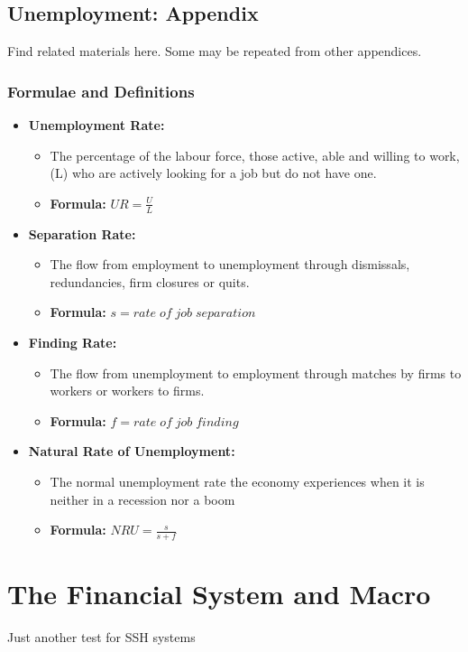 \documentclass[12pt, letterpaper]{article}
\begin{document}
\subsection{Unemployment: Appendix}
Find related materials here. Some may be repeated from other appendices.
\subsubsection{Formulae and Definitions}
\begin{itemize}
	\item \textbf{Unemployment Rate:}
		\begin{itemize}
			\item The percentage of the labour force, those active, able and willing to work, (L) who are actively looking for a job but do not have one.
			\item \textbf{Formula:} $UR = \frac{U}{L}$
		\end{itemize}
	\item	\textbf{Separation Rate:}
		\begin{itemize}
			\item The flow from employment to unemployment through dismissals, redundancies, firm closures or quits.
			\item \textbf{Formula:} $s = rate\;of\;job\;separation$
		\end{itemize}
	\item	\textbf{Finding Rate:}
		\begin{itemize}
			\item The flow from unemployment to employment through matches by firms to workers or workers to firms.
			\item \textbf{Formula:} $f = rate\;of\;job\;finding$
		\end{itemize}
	\item \textbf{Natural Rate of Unemployment:}
		\begin{itemize}
			\item The normal unemployment rate the economy experiences when it is neither in a recession nor a boom
			\item \textbf{Formula:} $NRU = \frac{s}{s+f}$
		\end{itemize}	
\end{itemize}

\newpage
\section{The Financial System and Macro}
Just another test for SSH systems
\end{document}
